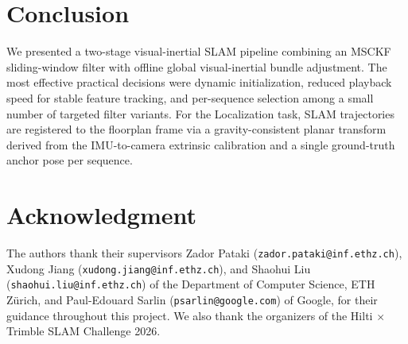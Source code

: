 \documentclass[journal]{IEEEtran}
\begin{document}
\section{Conclusion}

We presented a two-stage visual-inertial SLAM pipeline combining an MSCKF
sliding-window filter with offline global visual-inertial bundle adjustment.
The most effective practical decisions were dynamic initialization, reduced
playback speed for stable feature tracking, and per-sequence selection among
a small number of targeted filter variants.
For the Localization task, SLAM trajectories are registered to the floorplan
frame via a gravity-consistent planar transform derived from the IMU-to-camera
extrinsic calibration and a single ground-truth anchor pose per sequence.


\section*{Acknowledgment}

The authors thank their supervisors Zador Pataki
(\texttt{zador.pataki@inf.ethz.ch}), Xudong Jiang
(\texttt{xudong.jiang@inf.ethz.ch}), and Shaohui Liu
(\texttt{shaohui.liu@inf.ethz.ch}) of the Department of Computer Science,
ETH Z\"urich, and Paul-Edouard Sarlin (\texttt{psarlin@google.com}) of
Google, for their guidance throughout this project.
We also thank the organizers of the Hilti $\times$ Trimble SLAM Challenge 2026.



\end{document}
